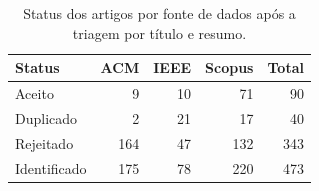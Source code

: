 \begin{table}[h]
\centering
\caption{Status dos artigos por fonte de dados após a triagem por título e resumo.}
\label{tab:status_fontes}
\begin{tabular}{lrrrr}
\toprule
Status & ACM & IEEE & Scopus & Total \\
\midrule
Aceito    &   9 &  10 &  71 &  90 \\
Duplicado &   2 &  21 &  17 &  40 \\
Rejeitado & 164 &  47 & 132 & 343 \\
\midrule
Identificado & 175 &  78 & 220 & 473 \\
\bottomrule
\end{tabular}
\end{table}
